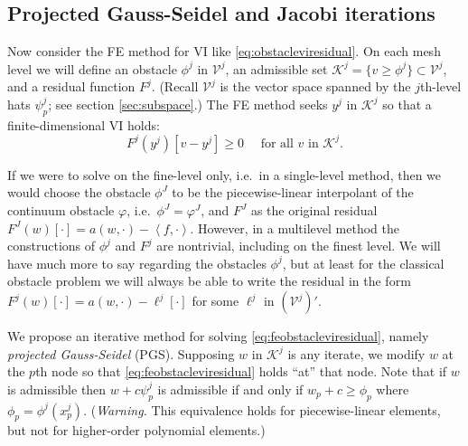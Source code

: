 \documentclass[letterpaper,final,12pt,reqno]{amsart}
\theoremstyle{claim}
\newcommand{\ip}[2]{\left<#1,#2\right>}
\numberwithin{equation}{section}
\numberwithin{figure}{section}
\numberwithin{table}{section}
\numberwithin{theorem}{section}
\begin{document}
\subsection*{Projected Gauss-Seidel and Jacobi iterations}  Now consider the FE method for VI like \eqref{eq:obstacleviresidual}.  On each mesh level we will define an obstacle $\phi^j$ in $\mathcal{V}^j$, an admissible set $\mathcal{K}^j = \{v \ge \phi^j\} \subset \mathcal{V}^j$, and a residual function $F^j$.  (Recall $\mathcal{V}^j$ is the vector space spanned by the $j$th-level hats $\psi_p^j$; see section \ref{sec:subspace}.)  The FE method seeks $y^j$ in $\mathcal{K}^j$ so that a finite-dimensional VI holds:
\begin{equation}
  F^j(y^j)[v-y^j] \ge 0 \quad \text{ for all } v \text{ in } \mathcal{K}^j. \label{eq:feobstacleviresidual}
\end{equation}

If we were to solve on the fine-level only, i.e.~in a single-level method, then we would choose the obstacle $\phi^J$ to be the piecewise-linear interpolant of the continuum obstacle $\varphi$, i.e.~$\phi^J=\varphi^J$, and $F^J$ as the original residual $F^J(w)[\cdot] = a(w,\cdot) - \ip{f}{\cdot}$.  However, in a multilevel method the constructions of $\phi^j$ and $F^j$ are nontrivial, including on the finest level.  We will have much more to say regarding the obstacles $\phi^j$, but at least for the classical obstacle problem we will always be able to write the residual in the form $F^j(w)[\cdot] = a(w,\cdot) - \ell^j[\cdot]$ for some $\ell^j$ in $(\mathcal{V}^j)'$.

We propose an iterative method for solving \eqref{eq:feobstacleviresidual}, namely \emph{projected Gauss-Seidel} (PGS).  Supposing $w$ in $\mathcal{K}^j$ is any iterate, we modify $w$ at the $p$th node so that \eqref{eq:feobstacleviresidual} holds ``at'' that node.  Note that if $w$ is admissible then $w+c\psi_p^j$ is admissible if and only if $w_p + c \ge \phi_p$ where $\phi_p = \phi^j(x_p^j)$.  (\emph{Warning.}  This equivalence holds for piecewise-linear elements, but not for higher-order polynomial elements.)
\end{document}
